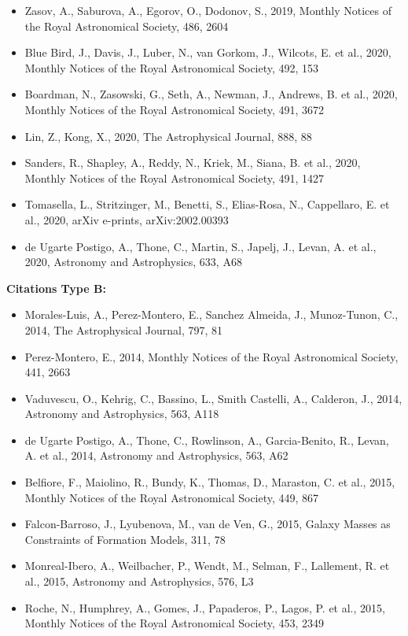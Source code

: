 \documentclass{letter}
\begin{document}
\begin{enumerate}
\begin{itemize}
\item Zasov, A., Saburova, A., Egorov, O., Dodonov, S., 2019, Monthly Notices of the Royal Astronomical Society, 486, 2604
\item Blue Bird, J., Davis, J., Luber, N., van Gorkom, J., Wilcots, E. et al., 2020, Monthly Notices of the Royal Astronomical Society, 492, 153
\item Boardman, N., Zasowski, G., Seth, A., Newman, J., Andrews, B. et al., 2020, Monthly Notices of the Royal Astronomical Society, 491, 3672
\item Lin, Z., Kong, X., 2020, The Astrophysical Journal, 888, 88
\item Sanders, R., Shapley, A., Reddy, N., Kriek, M., Siana, B. et al., 2020, Monthly Notices of the Royal Astronomical Society, 491, 1427
\item Tomasella, L., Stritzinger, M., Benetti, S., Elias-Rosa, N., Cappellaro, E. et al., 2020, arXiv e-prints, arXiv:2002.00393
\item de Ugarte Postigo, A., Thone, C., Martin, S., Japelj, J., Levan, A. et al., 2020, Astronomy and Astrophysics, 633, A68
\end{itemize}
{\bf Citations Type B:}
\begin{itemize}
\item Morales-Luis, A., Perez-Montero, E., Sanchez Almeida, J., Munoz-Tunon, C., 2014, The Astrophysical Journal, 797, 81
\item Perez-Montero, E., 2014, Monthly Notices of the Royal Astronomical Society, 441, 2663
\item Vaduvescu, O., Kehrig, C., Bassino, L., Smith Castelli, A., Calderon, J., 2014, Astronomy and Astrophysics, 563, A118
\item de Ugarte Postigo, A., Thone, C., Rowlinson, A., Garcia-Benito, R., Levan, A. et al., 2014, Astronomy and Astrophysics, 563, A62
\item Belfiore, F., Maiolino, R., Bundy, K., Thomas, D., Maraston, C. et al., 2015, Monthly Notices of the Royal Astronomical Society, 449, 867
\item Falcon-Barroso, J., Lyubenova, M., van de Ven, G., 2015, Galaxy Masses as Constraints of Formation Models, 311, 78
\item Monreal-Ibero, A., Weilbacher, P., Wendt, M., Selman, F., Lallement, R. et al., 2015, Astronomy and Astrophysics, 576, L3
\item Roche, N., Humphrey, A., Gomes, J., Papaderos, P., Lagos, P. et al., 2015, Monthly Notices of the Royal Astronomical Society, 453, 2349

\end{itemize}
\end{enumerate}
\end{document}
